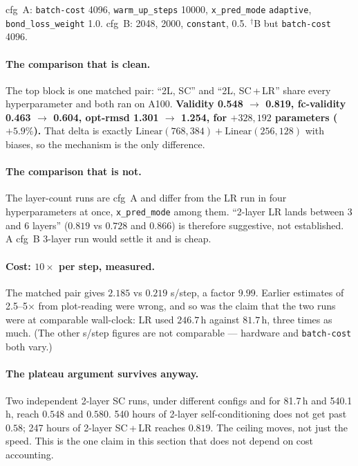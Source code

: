 \documentclass[11pt,a4paper]{article}
\newcommand{\code}[1]{\texttt{#1}}
\begin{document}
\noindent
cfg~A: \code{batch-cost} 4096, \code{warm\_up\_steps} 10000, \code{x\_pred\_mode}
\code{adaptive}, \code{bond\_loss\_weight} 1.0.\quad
cfg~B: 2048, 2000, \code{constant}, 0.5.\quad
$^\dagger$B but \code{batch-cost} 4096.

\paragraph{The comparison that is clean.} The top block is one matched pair: ``2L, SC''
and ``2L, SC\,+\,LR'' share every hyperparameter and both ran on A100.
\textbf{Validity 0.548 $\to$ 0.819, fc-validity 0.463 $\to$ 0.604, opt-rmsd 1.301 $\to$
1.254, for $+328{,}192$ parameters ($+5.9\%$).} That delta is exactly
$\mathrm{Linear}(768,384)+\mathrm{Linear}(256,128)$ with biases, so the mechanism is
the only difference.

\paragraph{The comparison that is not.} The layer-count runs are cfg~A and differ from
the LR run in four hyperparameters at once, \code{x\_pred\_mode} among them. ``2-layer
LR lands between 3 and 6 layers'' ($0.819$ vs $0.728$ and $0.866$) is therefore
suggestive, not established. A cfg~B 3-layer run would settle it and is cheap.

\paragraph{Cost: $10\times$ per step, measured.} The matched pair gives
$2.185$ vs $0.219$ s/step, a factor $9.99$. Earlier estimates of 2.5--5$\times$ from
plot-reading were wrong, and so was the claim that the two runs were at comparable
wall-clock: LR used $246.7$\,h against $81.7$\,h, three times as much. (The other s/step
figures are not comparable --- hardware and \code{batch-cost} both vary.)

\paragraph{The plateau argument survives anyway.} Two independent 2-layer SC runs, under
different configs and for 81.7\,h and 540.1\,h, reach $0.548$ and $0.580$. 540 hours of
2-layer self-conditioning does not get past $0.58$; 247 hours of 2-layer SC\,+\,LR
reaches $0.819$. The ceiling moves, not just the speed. This is the one claim in this
section that does not depend on cost accounting.
\end{document}
